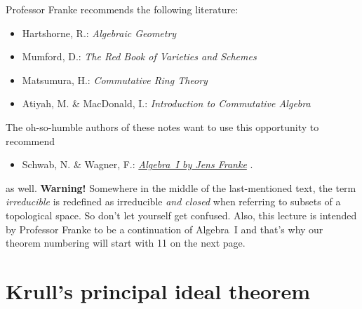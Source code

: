 \documentclass[a4paper,parskip=half,numbers=enddot, DIV=12]{scrreprt}
\begin{document}
Professor Franke recommends the following literature:
\begin{itemize}
	\item Hartshorne, R.: \emph{Algebraic Geometry}
	\item Mumford, D.: \emph{The Red Book of Varieties and Schemes}
	\item Matsumura, H.: \emph{Commutative Ring Theory} \cite{matsumuraCRT}
	\item Atiyah, M. \& MacDonald, I.: \emph{Introduction to Commutative Algebra}
\end{itemize}
The oh-so-humble authors of these notes want to use this opportunity to recommend
\begin{itemize}
	\item Schwab, N. \& Wagner, F.:  \href{https://github.com/Nicholas42/AlgebraFranke/tree/master/AlgebraI}{\emph{Algebra~I by Jens Franke}} \cite{alg1}.
\end{itemize}
as well. \textbf{Warning!} Somewhere in the middle of the last-mentioned text, the term \emph{irreducible} is redefined as irreducible \emph{and closed} when referring to subsets of a topological space. So don't let yourself get confused. Also, this lecture is intended by Professor Franke to be a continuation of Algebra~I and that's why our theorem numbering will start with 11 on the next page. 

\chapter{Krull's principal ideal theorem}
\end{document}
